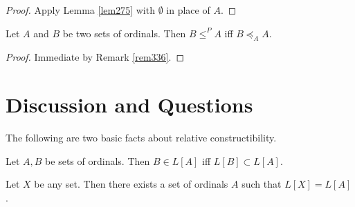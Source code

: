 \documentclass[12pt]{article}
\numberwithin{equation}{section}
\begin{document}
\begin{proof}
Apply Lemma \ref{lem275} with $\emptyset$ in place of $A$. 
\end{proof}

\begin{cor}
Let $A$ and $B$ be two sets of ordinals. Then $B \leq^P A$ iff $B \preceq_A A$.
\end{cor}

\begin{proof}
Immediate by Remark \ref{rem336}.
\end{proof}

\section{Discussion and Questions}

The following are two basic facts about relative constructibility.

\begin{fact}\label{fact276}
Let $A, B$ be sets of ordinals. Then $B \in L[A]$ iff $L[B] \subset L[A]$.
\end{fact}

\begin{fact}\label{fact277}
Let $X$ be any set. Then there exists a set of ordinals $A$ such that $L[X] = L[A]$.
\end{fact}
\end{document}

